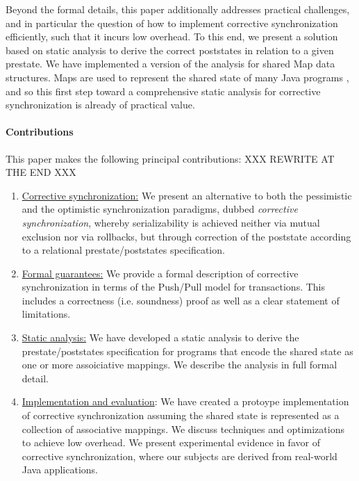 Beyond the formal details, this paper additionally addresses practical challenges, and in particular the question of how to implement corrective synchronization efficiently, such that it incurs low overhead. To this end, we present a solution based on static analysis to derive the correct poststates in relation to a given prestate. We have implemented a version of the analysis for shared {\sf Map} data structures. {\sf Map}s are used to represent the shared state of many Java programs \cite{OhadOOPSLA}, and so this first step toward a comprehensive static analysis for corrective synchronization is already of practical value.


\paragraph{Contributions} This paper makes the following principal contributions: XXX REWRITE AT THE END XXX
\begin{enumerate}
	\item \underline{Corrective synchronization:} We present an alternative to both the pessimistic and the optimistic synchronization paradigms, dubbed \emph{corrective synchronization}, whereby serializability is achieved neither via mutual exclusion nor via rollbacks, but through correction of the poststate according to a relational prestate/poststates specification.
	\item \underline{Formal guarantees:} We provide a formal description of corrective synchronization in terms of the Push/Pull model for transactions. This includes a correctness (i.e. soundness) proof as well as a clear statement of limitations.
	\item \underline{Static analysis:} We have developed a static analysis to derive the prestate/poststates specification for programs that encode the shared state as one or more assoiciative mappings. We describe the analysis in full formal detail.
	\item \underline{Implementation and evaluation}: We have created a protoype implementation of corrective synchronization assuming the shared state is represented as a collection of associative mappings. We discuss techniques and optimizations to achieve low overhead. We present experimental evidence in favor of corrective synchronization, where our subjects are derived from real-world Java applications.
\end{enumerate}
